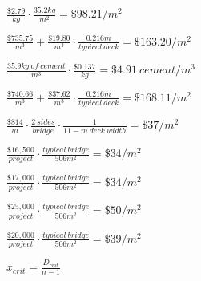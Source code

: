 \documentclass{article}
\begin{document}
\normalsize $ \frac{\$2.79}{kg} \cdot \frac{35.2kg}{m^2} = \$98.21/m^2 $
\newline

\normalsize $ \frac{\$735.75}{m^3} + \frac{\$19.80}{m^3} \cdot \frac{0.216m}{typical \: deck} = \$163.20/m^2 $
\newline

\normalsize $ \frac{35.9 kg \: of \: cement}{m^3} \cdot \frac{\$0.137}{kg} = \$4.91 \: cement/m^3 $
\newline

\normalsize $ \frac{\$740.66}{m^3} + \frac{\$37.62}{m^3} \cdot \frac{0.216m}{typical \: deck} = \$168.11/m^2 $
\newline

\normalsize $ \frac{\$814}{m} \cdot \frac{2 \: sides}{bridge} \cdot \frac{1}{11-m \: deck \: width} = \$37/m^2 $
\newline

\normalsize $ \frac{\$16,500}{project} \cdot \frac{typical \: bridge}{506m^2} = \$34/m^2 $
\newline

\normalsize $ \frac{\$17,000}{project} \cdot \frac{typical \: bridge}{506m^2} = \$34/m^2 $
\newline

\normalsize $ \frac{\$25,000}{project} \cdot \frac{typical \: bridge}{506m^2} = \$50/m^2 $
\newline

\normalsize $ \frac{\$20,000}{project} \cdot \frac{typical \: bridge}{506m^2} = \$39/m^2 $
\newline

\normalsize $ x_{crit} = \frac{D_{crit}}{n-1} $
\newline
\end{document}
